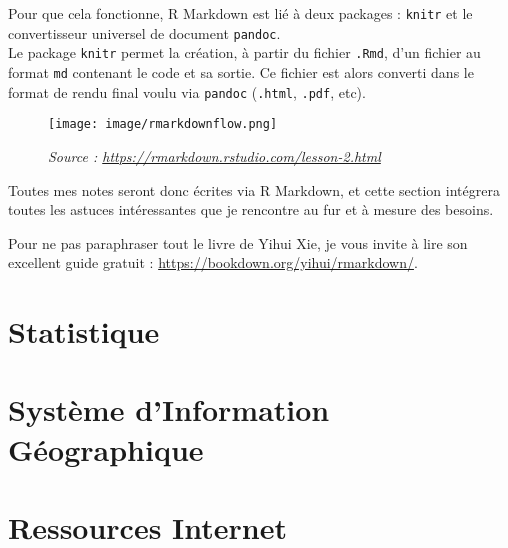 \documentclass[
]{book}
\begin{document}
Pour que cela fonctionne, R Markdown est lié à deux packages : \texttt{knitr} et le
convertisseur universel de document \texttt{pandoc}.\\
Le package \texttt{knitr} permet la création, à partir du fichier \texttt{.Rmd}, d'un fichier
au format \texttt{md} contenant le code et sa sortie. Ce fichier est alors converti
dans le format de rendu final voulu via \texttt{pandoc} (\texttt{.html}, \texttt{.pdf}, etc).

\begin{figure}
\centering
\texttt{[image: image/rmarkdownflow.png]}
\caption{\emph{Source : \url{https://rmarkdown.rstudio.com/lesson-2.html}}}
\end{figure}

Toutes mes notes seront donc écrites via R Markdown, et cette section intégrera
toutes les astuces intéressantes que je rencontre au fur et à mesure des
besoins.

Pour ne pas paraphraser tout le livre de Yihui Xie, je vous invite à
lire son excellent guide gratuit : \url{https://bookdown.org/yihui/rmarkdown/}.

\hypertarget{statistique}{%
\chapter{Statistique}\label{statistique}}

\hypertarget{SIG}{%
\chapter{Système d'Information Géographique}\label{SIG}}

\hypertarget{web-sources}{%
\chapter{Ressources Internet}\label{web-sources}}

\printbibliography
\end{document}
